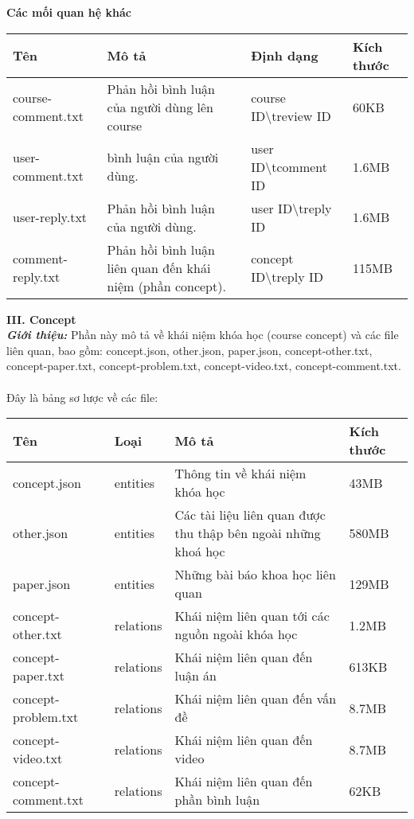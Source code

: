 %
\textbf{Các mối quan hệ khác}
\begin{center}
\begin{tabular}{|| m{5em}  m{10em}  m{11em}  m{5em}||} 
 \hline
 Tên & Mô tả & Định dạng & Kích thước \\ [0.5ex] 
 \hline\hline
course-comment.txt & Phản hồi bình luận của người dùng lên course & {course ID}\textbackslash t{review ID} &60KB \\
 \hline
 user-comment.txt &bình luận của người dùng. & {user ID}\textbackslash t{comment ID} & 1.6MB \\ \hline
 user-reply.txt & Phản hồi bình luận của người dùng.  & {user ID}\textbackslash t{reply ID} & 1.6MB \\ \hline
 comment-reply.txt& Phản hồi bình luận liên quan đến khái niệm (phần concept). & {concept ID}\textbackslash t{reply ID} &115MB  \\ [1ex] 
 \hline
\end{tabular}
\end{center}
%
\textbf{III. Concept}\\
\textbf{\textit{Giới thiệu:}} Phần này mô tả về khái niệm khóa học (course concept) và các file liên quan, bao gồm: concept.json, other.json, paper.json, concept-other.txt, concept-paper.txt, concept-problem.txt, concept-video.txt, concept-comment.txt.\\
\\
Đây là bảng sơ lược về các file:
%
\begin{center}
\begin{tabular}{|| m{5em}  m{5em}  m{18em}  m{5em}||} 
 \hline
 Tên & Loại & Mô tả & Kích thước \\ [0.5ex] 
 \hline\hline
 concept.json & entities & Thông tin về khái niệm khóa học & 43MB \\ 
 \hline
 other.json & entities & Các tài liệu liên quan được thu thập bên ngoài những khoá học & 580MB \\
 \hline
 paper.json & entities & Những bài báo khoa học liên quan & 129MB \\
 \hline
 concept-other.txt & relations & Khái niệm liên quan tới các nguồn ngoài khóa học & 1.2MB \\
 \hline
 concept-paper.txt & relations & Khái niệm liên quan đến luận án & 613KB \\
 \hline
 concept-problem.txt & relations & Khái niệm liên quan đến vấn đề & 8.7MB \\
 \hline
  concept-video.txt & relations & Khái niệm liên quan đến video & 8.7MB \\
 \hline
 concept-comment.txt & relations & Khái niệm liên quan đến phần bình luận & 62KB \\ [1ex] 
 \hline
\end{tabular}
\end{center}
